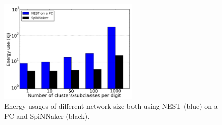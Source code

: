 \begin{figure}[hbt!]
	\centering
	\includegraphics[width=0.6\textwidth]{pics_bench/fig8.jpg}
	\caption[Energy usages of different network size.]{Energy usages of different network size both using NEST (blue) on a PC and SpiNNaker (black).}
	\label{fig:energy}
\end{figure}
%
%
%
%
